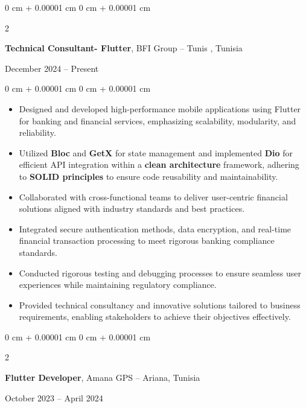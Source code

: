 \documentclass[10pt, letterpaper]{article}
\newenvironment{highlights}{
    \begin{itemize}[
        topsep=0.10 cm,
        parsep=0.10 cm,
        partopsep=0pt,
        itemsep=0pt,
        leftmargin=0 cm + 10pt
    ]
}{
    \end{itemize}
} %
\newenvironment{onecolentry}{
    \begin{adjustwidth}{
        0 cm + 0.00001 cm
    }{
        0 cm + 0.00001 cm
    }
}{
    \end{adjustwidth}
} %
\newenvironment{twocolentry}[2][]{
    \onecolentry
    \def\secondColumn{#2}
    \setcolumnwidth{\fill, 4.5 cm}
    \begin{paracol}{2}
}{
    \switchcolumn \raggedleft \secondColumn
    \end{paracol}
    \endonecolentry
} %
\begin{document}
        \begin{twocolentry}{
            December 2024 – Present
        }

                    \textbf{Technical Consultant- Flutter}, BFI Group  -- Tunis , Tunisia
        \end{twocolentry}
        
        \vspace{0.10 cm}
        \begin{onecolentry}
            \begin{highlights}
                \item Designed and developed high-performance mobile applications using Flutter for banking and financial services, emphasizing scalability, modularity, and reliability.
               \item Utilized \textbf{Bloc} and \textbf{GetX} for state management and implemented \textbf{Dio} for efficient API integration within a \textbf{clean architecture} framework, adhering to \textbf{SOLID principles} to ensure code reusability and maintainability.
  
                \item Collaborated with cross-functional teams to deliver user-centric financial solutions aligned with industry standards and best practices.  
                \item Integrated secure authentication methods, data encryption, and real-time financial transaction processing to meet rigorous banking compliance standards.  
                 \item Conducted rigorous testing and debugging processes to ensure seamless user experiences while maintaining regulatory compliance.    
                  \item Provided technical consultancy and innovative solutions tailored to business requirements, enabling stakeholders to achieve their objectives effectively.
  
            \end{highlights}
        \end{onecolentry}
        
        \vspace{0.2 cm}
        
        \begin{twocolentry}{
            October 2023 – April 2024
        }
        
            \textbf{Flutter Developer}, Amana GPS -- Ariana, Tunisia
        \end{twocolentry}
        
\end{document}
